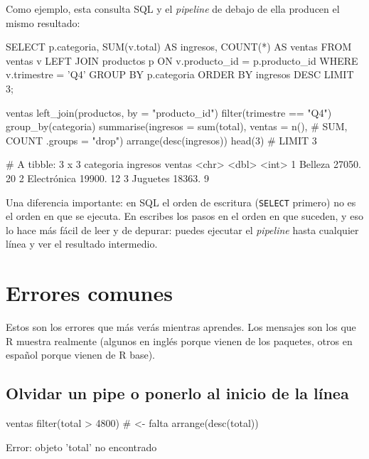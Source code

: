 Como ejemplo, esta consulta SQL y el \emph{pipeline} de 
debajo de ella producen el mismo resultado:

\begin{sqlcode}
SELECT p.categoria,
       SUM(v.total)  AS ingresos,
       COUNT(*)      AS ventas
FROM ventas v
LEFT JOIN productos p ON v.producto_id = p.producto_id
WHERE v.trimestre = 'Q4'
GROUP BY p.categoria
ORDER BY ingresos DESC
LIMIT 3;
\end{sqlcode}

\begin{rcode}
ventas %
  left_join(productos, by = "producto_id") %
  filter(trimestre == "Q4") %
  group_by(categoria) %
  summarise(ingresos = sum(total), ventas = n(),    # SUM, COUNT
            .groups = "drop") %
  arrange(desc(ingresos)) %
  head(3)                                           # LIMIT 3
\end{rcode}
\begin{rsalida}
# A tibble: 3 x 3
  categoria   ingresos ventas
  <chr>          <dbl>  <int>
1 Belleza       27050.     20
2 Electrónica   19900.     12
3 Juguetes      18363.      9
\end{rsalida}

Una diferencia importante: en SQL el orden de escritura (\texttt{SELECT}
primero) no es el orden en que se ejecuta. En  escribes los
pasos en el orden en que suceden, y eso lo hace más fácil de leer y de
depurar: puedes ejecutar el \emph{pipeline} hasta cualquier línea y ver el
resultado intermedio.

\section{Errores comunes}
\label{sec:m2-errores}

Estos son los errores que más verás mientras aprendes. Los mensajes son los
que R muestra realmente (algunos en inglés porque vienen de los paquetes,
otros en español porque vienen de R base).

\subsection{Olvidar un pipe o ponerlo al inicio de la línea}

\begin{rnoejecutar}
ventas %
  filter(total > 4800)      # <- falta %
  arrange(desc(total))
\end{rnoejecutar}
\begin{rsalida}
Error: objeto 'total' no encontrado
\end{rsalida}

